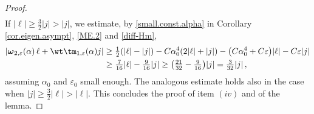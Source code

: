 \documentclass[a4paper,reqno,10pt]{article}
\newcommand{\bomega}{{\boldsymbol{\omega}}}
\begin{document}
\begin{proof}
\begin{align}
    \end{align}
    If $|\ell|\geq \frac32 |j|> |j|$, we estimate, by \eqref{small.const.alpha} in Corollary \ref{cor.eigen.asympt}, \eqref{ME.2} and \eqref{diff-Hm},
    \begin{align}
        | \bomega_{2,\varepsilon}(\alpha)\,\ell + \wt\tm_{1,\varepsilon}(\alpha) j | & \geq \tfrac12 ( |\ell| - |j| ) - C \alpha_{0}^4 ( 2|\ell| +|j| ) - \big( C\alpha_0^4 + C\varepsilon \big)|\ell| - C\varepsilon |j| \\
        & \geq \tfrac{7}{16} |\ell| - \tfrac{9}{16}  |j| \geq \big( \tfrac{21}{32} - \tfrac{9}{16} \big) |j| = \tfrac{3}{32} |j|\,,
    \end{align}
    assuming $\alpha_0$ and $\varepsilon_0$ small enough. The analogous estimate holds also in the case when $|j|\geq  \tfrac32 |\ell|>|\ell|$. This concludes the proof of item $(iv)$ and of the lemma.
\end{proof}
\end{document}
